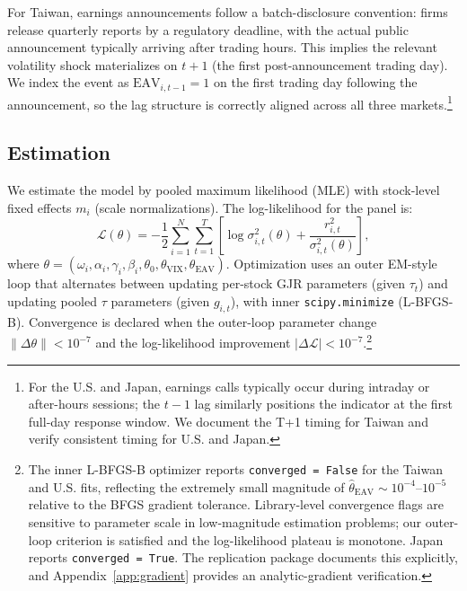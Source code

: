 \documentclass[12pt,a4paper]{article}
\begin{document}
For Taiwan, earnings announcements follow a batch-disclosure convention: firms
release quarterly reports by a regulatory deadline, with the actual public
announcement typically arriving after trading hours. This implies the relevant
volatility shock materializes on $t+1$ (the first post-announcement trading day).
We index the event as $\mathrm{EAV}_{i,t-1}=1$ on the first trading day
following the announcement, so the lag structure is correctly aligned across all
three markets.\footnote{%
  For the U.S. and Japan, earnings calls typically occur during intraday or
  after-hours sessions; the $t-1$ lag similarly positions the indicator at the
  first full-day response window. We document the T+1 timing for Taiwan
  and verify consistent timing for U.S. and Japan.}

\subsection{Estimation}

We estimate the model by pooled maximum likelihood (MLE) with stock-level fixed
effects $m_i$ (scale normalizations). The log-likelihood for the panel is:
%
\begin{equation}
\mathcal{L}(\theta) = -\frac{1}{2} \sum_{i=1}^{N} \sum_{t=1}^{T}
  \left[ \log \sigma^2_{i,t}(\theta) + \frac{r^2_{i,t}}{\sigma^2_{i,t}(\theta)} \right],
\label{eq:ll}
\end{equation}
%
where $\theta = (\omega_i, \alpha_i, \gamma_i, \beta_i, \theta_0,
\theta_{\mathrm{VIX}}, \theta_{\mathrm{EAV}})$. Optimization uses an
outer EM-style loop that alternates between updating per-stock GJR parameters
(given $\tau_t$) and updating pooled $\tau$ parameters (given $g_{i,t}$),
with inner \texttt{scipy.minimize} (L-BFGS-B). Convergence is declared when
the outer-loop parameter change $\|\Delta\theta\| < 10^{-7}$ and the
log-likelihood improvement $|\Delta\mathcal{L}| < 10^{-7}$.\footnote{%
  The inner L-BFGS-B optimizer reports \texttt{converged = False} for the
  Taiwan and U.S. fits, reflecting the extremely small magnitude of
  $\hat{\theta}_{\mathrm{EAV}} \sim 10^{-4}$--$10^{-5}$ relative to the
  BFGS gradient tolerance. Library-level convergence flags are sensitive to
  parameter scale in low-magnitude estimation problems; our outer-loop criterion is satisfied
  and the log-likelihood plateau is monotone. Japan reports \texttt{converged = True}.
  The replication package documents this explicitly, and Appendix~\ref{app:gradient}
  provides an analytic-gradient verification.}
\end{document}
